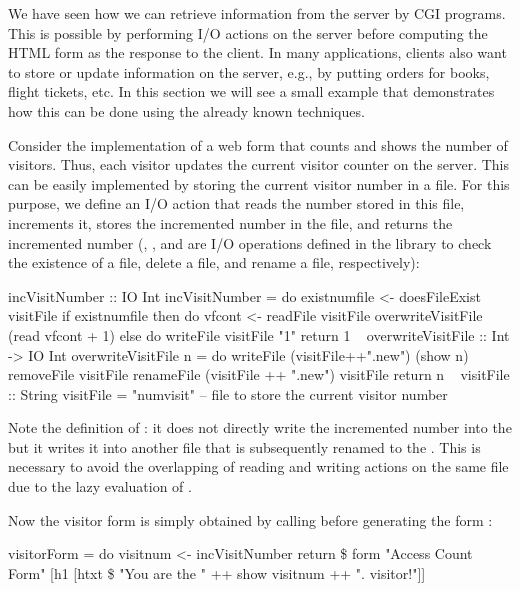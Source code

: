 We have seen how we can retrieve information from the server
by CGI programs. This is possible by performing I/O actions
on the server before computing the HTML form as the response to
the client. In many applications, clients also want to store
or update information on the server, e.g., by putting orders
for books, flight tickets, etc.
In this section we will see a small example that demonstrates
how this can be done using the already known techniques.

Consider the implementation of a web form that counts
and shows the number of visitors. Thus, each visitor
updates the current visitor counter on the server.
This can be easily implemented by storing the current
visitor number in a file.
For this purpose, we define an I/O action 
that reads the number stored in this file, increments it,
stores the incremented number
in the file, and returns the incremented number
(,
, and
 are
I/O operations defined in the library 
to check the existence of a file, delete a file, and
rename a file, respectively):
%
\begin{prog}
incVisitNumber :: IO Int
incVisitNumber = do
 existnumfile <- doesFileExist visitFile
 if existnumfile
   then do vfcont <- readFile visitFile
           overwriteVisitFile (read vfcont + 1)
   else do writeFile visitFile "1"
           return 1
~
overwriteVisitFile :: Int -> IO Int\label{sec-overwriteVisitFile}
overwriteVisitFile n = do
  writeFile (visitFile++".new") (show n)
  removeFile visitFile
  renameFile (visitFile ++ ".new") visitFile
  return n
~
visitFile :: String
visitFile = "numvisit"  -- file to store the current visitor number
\end{prog}
%
Note the definition of :
it does not directly write the incremented number
into the  but it writes it into another file that is
subsequently renamed to the .
This is necessary to avoid the overlapping of reading and writing actions
on the same file due to the lazy evaluation of .

Now the visitor form is simply obtained by calling 
before generating the form
:
%
\begin{prog}
visitorForm = do
  visitnum <- incVisitNumber
  return \$ form "Access Count Form"
           [h1 [htxt \$ "You are the " ++ show visitnum ++ ". visitor!"]]
\end{prog}


